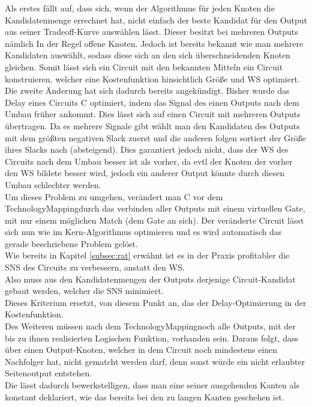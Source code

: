 \documentclass[11pt, a4paper, german]{article}
\newcommand{\TM}{TechnologyMapping}
\begin{document}
Als erstes fällt auf, dass sich, wenn der Algorithmus für jeden Knoten die Kandidatenmenge errechnet hat, nicht einfach der beste Kandidat für den Output aus seiner Tradeoff-Kurve auswählen lässt. Dieser besitzt bei mehreren Outputs nämlich In der Regel offene Knoten. 
Jedoch ist bereits bekannt wie man mehrere Kandidaten auswählt, sodass diese sich an den sich überschneidenden Knoten gleichen. Somit lässt sich ein Circuit mit den bekannten Mitteln ein Circuit konstruieren, welcher eine Kostenfunktion hinsichtlich Größe und WS optimiert. \\

Die zweite Änderung hat sich dadurch bereits angekündigt. Bisher wurde das Delay eines Circuits C optimiert, indem das Signal des einen Outputs nach dem Umbau früher ankommt. Dies lässt sich auf einen Circuit mit mehreren Outputs übertragen. Da es mehrere Signale gibt wählt man den Kandidaten des Outputs mit dem größten negativen Slack zuerst und die anderen folgen sortiert der Größe ihres Slacks nach (absteigend). Dies garantiert jedoch nicht, dass der WS des Circuits nach dem Umbau besser ist als vorher, da evtl der Knoten der vorher den WS bildete besser wird, jedoch ein anderer Output könnte durch diesen Umbau schlechter werden. \\
Um dieses Problem zu umgehen, verändert man C vor dem \TM durch das verbinden aller Outputs mit einem virtuellen Gate, mit nur einem möglichen Match (dem Gate an sich). Der veränderte Circuit lässt sich nun wie im Kern-Algorithmus optimieren und es wird automatisch das gerade beschriebene Problem gelöst.\\ 
Wie bereits in Kapitel \ref{subsec:rat}  erwähnt ist es in der Praxis profitabler die SNS des Circuits zu verbessern, anstatt den WS.\\
Also muss aus den Kandidatenmengen der Outputs derjenige Circuit-Kandidat gebaut werden, welcher die SNS minimiert.\\
 Dieses Kriterium ersetzt, von diesem Punkt an,  das der Delay-Optimierung in der Kostenfunktion.\\
 
 Des Weiteren müssen nach dem \TM noch alle Outputs, mit der bis zu ihnen realisierten Logischen Funktion, vorhanden sein. Daraus folgt, dass über einen Output-Knoten, welcher in dem Circuit noch mindestens einen Nachfolger hat, nicht gematcht werden darf, denn sonst würde ein nicht erlaubter Seitenoutput entstehen.\\
 Die lässt dadurch bewerkstelligen, dass man eine seiner ausgehenden Kanten als konstant deklariert, wie das bereits bei den zu langen Kanten geschehen ist. 
\end{document}
